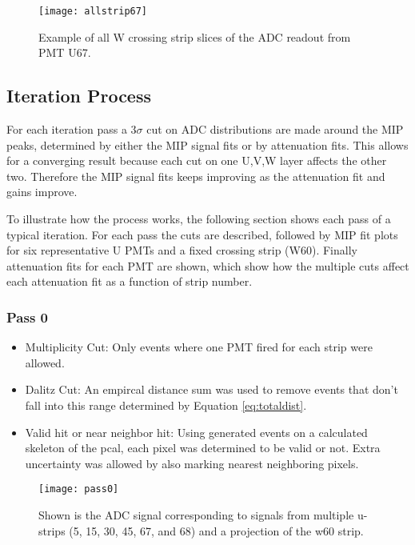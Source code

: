\begin{figure}[h]
    \centering
    \texttt{[image: allstrip67]}
    \caption{Example of all W crossing strip slices of the ADC readout from PMT U67.}
    \label{fig:allstrip67}
\end{figure}

\FloatBarrier
\subsection{Iteration Process}
For each iteration pass a $3\sigma$ cut on ADC distributions are made around the MIP peaks, determined by either the MIP signal fits or by attenuation fits.  This allows for a converging result because each cut on one U,V,W layer affects the other two. Therefore the MIP signal fits keeps improving as the attenuation fit and gains improve. 

To illustrate how the process works, the following section shows each pass of a typical iteration.  For each pass the cuts are described, followed by MIP fit plots for six representative U PMTs and a fixed crossing strip (W60).  Finally attenuation fits for each PMT are shown, which show how the multiple cuts affect each attenuation fit as a function of strip number. 

\clearpage
\FloatBarrier
\subsubsection{Pass 0}
\begin{itemize}
    \item Multiplicity Cut: Only events where one PMT fired for each strip were allowed.
    \item Dalitz Cut: An empircal distance sum was used to remove events that don't fall into 
    this range determined by Equation \ref{eq:totaldist}.
    \item Valid hit or near neighbor hit: Using generated events on a calculated skeleton of 
    the pcal, each pixel was determined to be valid or not. Extra uncertainty was allowed by 
    also marking nearest neighboring pixels.
\end{itemize}

\begin{figure}[h]
    \centering
    \texttt{[image: pass0]}
    \caption{Shown is the ADC signal corresponding to signals from multiple u-strips 
    (5, 15, 30, 45, 67, and 68) and a projection of the w60 strip.}
    \label{fig:pass0}
\end{figure}

